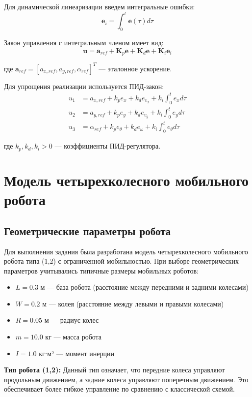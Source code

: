Для динамической линеаризации введем интегральные ошибки:
$$\mathbf{e}_i = \int_0^t \mathbf{e}(\tau) d\tau$$

Закон управления с интегральным членом имеет вид:
$$\mathbf{u} = \mathbf{a}_{ref} + \mathbf{K}_p \mathbf{e} + \mathbf{K}_d \dot{\mathbf{e}} + \mathbf{K}_i \mathbf{e}_i$$

где $\mathbf{a}_{ref} = [a_{x,ref}, a_{y,ref}, \alpha_{ref}]^T$ --- эталонное ускорение.

Для упрощения реализации используется ПИД-закон:
\begin{align}
u_1 &= a_{x,ref} + k_p e_x + k_d e_{v_x} + k_i \int_0^t e_x d\tau \\
u_2 &= a_{y,ref} + k_p e_y + k_d e_{v_y} + k_i \int_0^t e_y d\tau \\
u_3 &= \alpha_{ref} + k_p e_\theta + k_d e_\omega + k_i \int_0^t e_\theta d\tau
\end{align}

где $k_p, k_d, k_i > 0$ --- коэффициенты ПИД-регулятора.

\section{Модель четырехколесного мобильного робота}

\subsection{Геометрические параметры робота}

Для выполнения задания была разработана модель четырехколесного мобильного робота типа (1,2) с ограниченной мобильностью. При выборе геометрических параметров учитывались типичные размеры мобильных роботов:

\begin{itemize}
\item $L = 0.3$ м --- база робота (расстояние между передними и задними колесами)
\item $W = 0.2$ м --- колея (расстояние между левыми и правыми колесами)
\item $R = 0.05$ м --- радиус колес
\item $m = 10.0$ кг --- масса робота
\item $I = 1.0$ кг⋅м² --- момент инерции
\end{itemize}

\textbf{Тип робота (1,2):} Данный тип означает, что передние колеса управляют продольным движением, а задние колеса управляют поперечным движением. Это обеспечивает более гибкое управление по сравнению с классической схемой.

